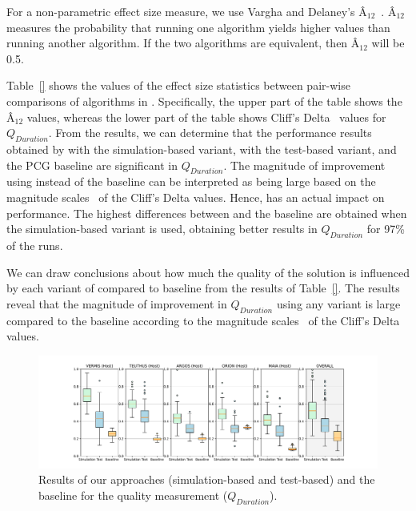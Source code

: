 For a non-parametric effect size measure, we use Vargha and Delaney's Â$_{12}$~\cite{Vargha2000,Grissom2005}. Â$_{12}$ measures the probability that running one algorithm yields higher values than running another algorithm. If the two algorithms are equivalent, then Â$_{12}$ will be 0.5.

Table~\ref{} shows the values of the effect size statistics between pair-wise comparisons of algorithms in \CaseStudy{}. Specifically, the upper part of the table shows the Â$_{12}$ values, whereas the lower part of the table shows Cliff's Delta~\cite{Cliff1996} values for $Q_{Duration}$. From the results, we can determine that the performance results obtained by \ApproachName{} with the simulation-based variant, \ApproachName{} with the test-based variant, and the PCG baseline are significant in $Q_{Duration}$. The magnitude of improvement using \ApproachName{} instead of the baseline can be interpreted as being large based on the magnitude scales~\cite{Romano2006} of the Cliff's Delta values. Hence, \ApproachName{} has an actual impact on performance. The highest differences between \ApproachName{} and the baseline are obtained when the simulation-based variant is used, obtaining better results in $Q_{Duration}$ for 97\% of the runs.

We can draw conclusions about how much the quality of the solution is influenced by each variant of \ApproachName{} compared to baseline from the results of Table~\ref{}. The results reveal that the magnitude of improvement in $Q_{Duration}$ using any variant is large compared to the baseline according to the magnitude scales~\cite{Romano2006} of the Cliff's Delta values.


\begin{figure}[ht!]
    \centering
    \includegraphics[width=\textwidth]{Figures/Imhotep_with_legend_and_oracle_average-v4.pdf}
    \caption{Results of our \ApproachName{} approaches (simulation-based and test-based) and the baseline for the quality measurement ($Q_{Duration}$).}
    \label{fig:results}
\end{figure}